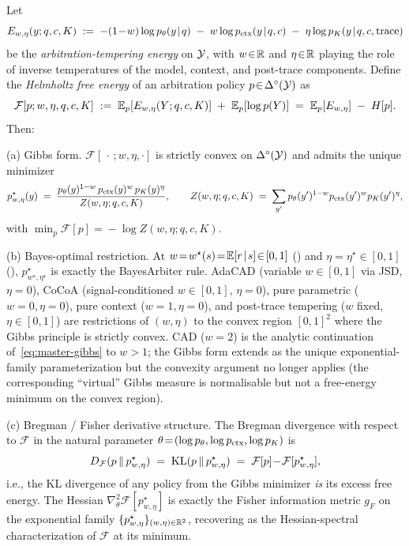 \begin{theorem}
\label{thm:free-energy-master}
Let
\[
E_{w,\eta}(y;q,c,K) \;:=\;
-(1\!-\!w)\log p_\theta(y\!\mid\!q)
\;-\;w\log p_\ctx(y\!\mid\!q,c)
\;-\;\eta\log p_K(y\!\mid\!q,c,\mathrm{trace})
\]
be the \emph{arbitration-tempering energy} on $\mathcal{Y}$, with
$w\!\in\!\mathbb{R}$ and $\eta\!\in\!\mathbb{R}$ playing the role of inverse
temperatures of the model, context, and post-trace components.
Define the \emph{Helmholtz free energy} of an arbitration policy
$p\!\in\!\Delta^\circ(\mathcal{Y})$ as
\[
\mathcal{F}[p;w,\eta,q,c,K]
\;:=\;
\mathbb{E}_p[E_{w,\eta}(Y;q,c,K)]\;+\;\mathbb{E}_p[\log p(Y)]
\;=\;
\mathbb{E}_p[E_{w,\eta}]\;-\;H[p].
\]
Then:

\textup{(a) Gibbs form.}  $\mathcal{F}[\,\cdot\,;w,\eta,\cdot]$ is
strictly convex on $\Delta^\circ(\mathcal{Y})$ and admits the unique minimizer
\begin{equation}
p^\star_{w,\eta}(y)
\;=\;
\frac{p_\theta(y)^{1-w}\,p_{\mathrm{ctx}}(y)^{w}\,p_K(y)^{\eta}}{Z(w,\eta;q,c,K)},
\qquad
Z(w,\eta;q,c,K)\;=\;\sum_{y'} p_\theta(y')^{1-w}p_{\mathrm{ctx}}(y')^{w}p_K(y')^{\eta},
\label{eq:master-gibbs}
\end{equation}
with $\min_p\mathcal{F}[p]\!=\!-\log Z(w,\eta;q,c,K)$.

\textup{(b) Bayes-optimal restriction.}  At
$w\!=\!w^\star(s)\!=\!\E[r\!\mid\!s]\!\in\![0,1]$
() and $\eta\!=\!\eta^\star\!\in\![0,1]$
(), $p^\star_{w^\star,\eta^\star}$ is
exactly the BayesArbiter rule.  AdaCAD (variable
$w\!\in\![0,1]$ via JSD, $\eta\!=\!0$), CoCoA (signal-conditioned
$w\!\in\![0,1]$, $\eta\!=\!0$), pure parametric
($w\!=\!0,\eta\!=\!0$), pure context ($w\!=\!1,\eta\!=\!0$), and
post-trace tempering ($w$ fixed, $\eta\!\in\![0,1]$) are
restrictions of $(w,\eta)$ to the convex region $[0,1]^{2}$
where the Gibbs principle is strictly convex.  CAD ($w\!=\!2$)
is the analytic continuation of~\eqref{eq:master-gibbs} to
$w\!>\!1$; the Gibbs form extends as the unique exponential-family
parameterization but the convexity argument no longer applies
(the corresponding ``virtual'' Gibbs measure is normalisable but
not a free-energy minimum on the convex region).

\textup{(c) Bregman / Fisher derivative structure.}
The Bregman divergence with respect to $\mathcal{F}$ in the natural
parameter $\theta\!=\!(\log p_\theta,\log p_{\mathrm{ctx}},\log p_K)$ is
\[
D_{\mathcal{F}}(p\,\|\,p^\star_{w,\eta})
\;=\;\operatorname{KL}(p\,\|\,p^\star_{w,\eta})
\;=\;\mathcal{F}[p]\!-\!\mathcal{F}[p^\star_{w,\eta}],
\]
i.e., the KL divergence of any policy from the Gibbs minimizer
\emph{is} its excess free energy.  The Hessian
$\nabla^{2}_\theta\mathcal{F}[p^\star_{w,\eta}]$ is exactly the
Fisher information metric $g_F$ on the exponential family
$\{p^\star_{w,\eta}\}_{(w,\eta)\in\mathbb{R}^{2}}$, recovering
 as the Hessian-spectral characterization
of $\mathcal{F}$ at its minimum.


\end{theorem}
